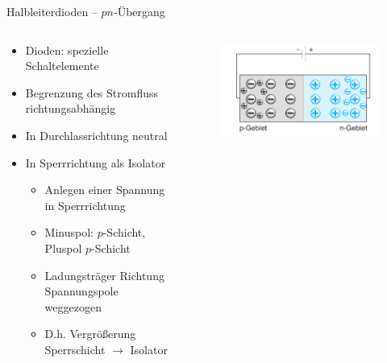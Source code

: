 \documentclass[12pt%
,aspectratio=169%
]{beamer}
\begin{document}
\begin{frame}{Halbleiterdioden -- $pn$-Übergang}
\begin{columns}[T] %
\begin{column}{.48\textwidth}
\begin{itemize}
	\item Dioden: spezielle Schaltelemente
	\item Begrenzung des Stromﬂuss richtungsabhängig
	\item In Durchlassrichtung neutral
	\item In Sperrrichtung als Isolator
	\begin{itemize}
		\item Anlegen einer Spannung in Sperrrichtung
		\item Minuspol: $p$-Schicht, Pluspol $p$-Schicht
		\item Ladungsträger Richtung Spannungspole weggezogen
		\item D.h. Vergrößerung Sperrschicht $\to$ Isolator
	\end{itemize}
\end{itemize}
\end{column}%
\hfill%
\begin{column}{.48\textwidth}
\begin{figure}
\center
\includegraphics[scale=0.5]{pictures/sperrrichtung}
\end{figure}
\end{column}%
\end{columns}
\end{frame}
\end{document}
